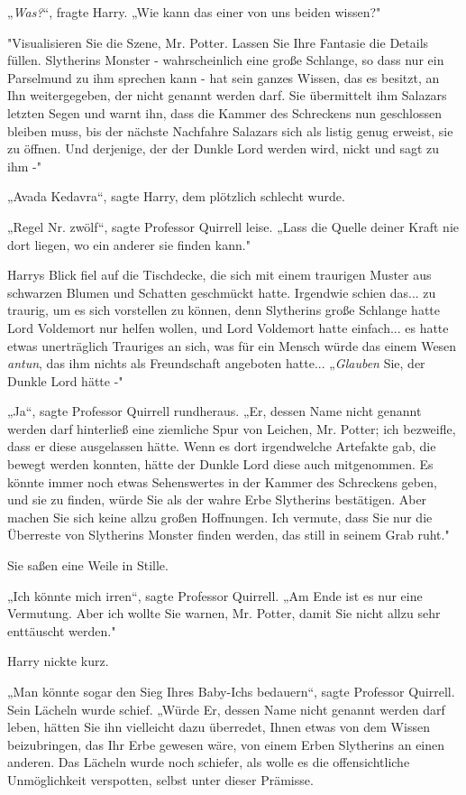 {„\emph{Was?}“, fragte Harry. „Wie kann das einer von uns beiden wissen?"

"Visualisieren Sie die Szene, Mr. Potter. Lassen Sie Ihre Fantasie die Details füllen. Slytherins Monster - wahrscheinlich eine große Schlange, so dass nur ein Parselmund zu ihm sprechen kann - hat sein ganzes Wissen, das es besitzt, an Ihn weitergegeben, der nicht genannt werden darf. Sie übermittelt ihm Salazars letzten Segen und warnt ihn, dass die Kammer des Schreckens nun geschlossen bleiben muss, bis der nächste Nachfahre Salazars sich als listig genug erweist, sie zu öffnen. Und derjenige, der der Dunkle Lord werden wird, nickt und sagt zu ihm -"

„Avada Kedavra“, sagte Harry, dem plötzlich schlecht wurde.

„Regel Nr. zwölf“, sagte Professor Quirrell leise. „Lass die Quelle deiner Kraft nie dort liegen, wo ein anderer sie finden kann."

Harrys Blick fiel auf die Tischdecke, die sich mit einem traurigen Muster aus schwarzen Blumen und Schatten geschmückt hatte. Irgendwie schien das... zu traurig, um es sich vorstellen zu können, denn Slytherins große Schlange hatte Lord Voldemort nur helfen wollen, und Lord Voldemort hatte einfach... es hatte etwas unerträglich Trauriges an sich, was für ein Mensch würde das einem Wesen \emph{antun}, das ihm nichts als Freundschaft angeboten hatte... „\emph{Glauben} Sie, der Dunkle Lord hätte -"

„Ja“, sagte Professor Quirrell rundheraus. „Er, dessen Name nicht genannt werden darf hinterließ eine ziemliche Spur von Leichen, Mr. Potter; ich bezweifle, dass er diese ausgelassen hätte. Wenn es dort irgendwelche Artefakte gab, die bewegt werden konnten, hätte der Dunkle Lord diese auch mitgenommen. Es könnte immer noch etwas Sehenswertes in der Kammer des Schreckens geben, und sie zu finden, würde Sie als der wahre Erbe Slytherins bestätigen. Aber machen Sie sich keine allzu großen Hoffnungen. Ich vermute, dass Sie nur die Überreste von Slytherins Monster finden werden, das still in seinem Grab ruht."

Sie saßen eine Weile in Stille.

„Ich könnte mich irren“, sagte Professor Quirrell. „Am Ende ist es nur eine Vermutung. Aber ich wollte Sie warnen, Mr. Potter, damit Sie nicht allzu sehr enttäuscht werden."

Harry nickte kurz.

„Man könnte sogar den Sieg Ihres Baby-Ichs bedauern“, sagte Professor Quirrell. Sein Lächeln wurde schief. „Würde Er, dessen Name nicht genannt werden darf leben, hätten Sie ihn vielleicht dazu überredet, Ihnen etwas von dem Wissen beizubringen, das Ihr Erbe gewesen wäre, von einem Erben Slytherins an einen anderen. Das Lächeln wurde noch schiefer, als wolle es die offensichtliche Unmöglichkeit verspotten, selbst unter dieser Prämisse.

}
